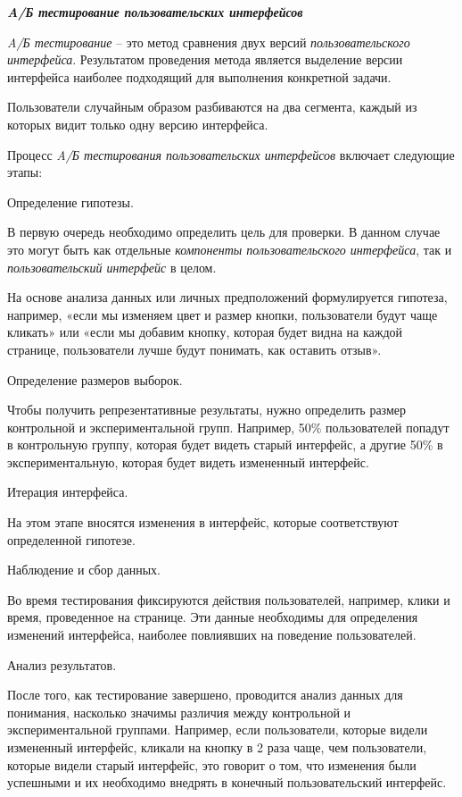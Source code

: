 \textbf{\textit{A/Б тестирование пользовательских интерфейсов}}

\textit{A/Б тестирование} -- это метод сравнения двух версий \textit{пользовательского интерфейса}. Результатом проведения метода является выделение версии интерфейса наиболее подходящий для выполнения конкретной задачи.

Пользователи случайным образом разбиваются на два сегмента, каждый из которых видит только одну версию интерфейса.

Процесс \textit{A/Б тестирования пользовательских интерфейсов} включает следующие этапы:

\begin{textitemize}
	\item Определение гипотезы. 
	
	В первую очередь необходимо определить цель для проверки. В данном случае это могут быть как отдельные \textit{компоненты пользовательского интерфейса}, так и \textit{пользовательский интерфейс} в целом.
	
	На основе анализа данных или личных предположений формулируется гипотеза, например, «если мы изменяем цвет и размер кнопки, пользователи будут чаще кликать» или «если мы добавим кнопку, которая будет видна на каждой странице, пользователи лучше будут понимать, как оставить отзыв».
	
	\item Определение размеров выборок. 
	
	Чтобы получить репрезентативные результаты, нужно определить размер контрольной и экспериментальной групп. Например, 50\% пользователей попадут в контрольную группу, которая будет видеть старый интерфейс, а другие 50\% в экспериментальную, которая будет видеть измененный интерфейс.
	
	\item Итерация интерфейса. 
	
	На этом этапе вносятся изменения в интерфейс, которые соответствуют определенной гипотезе. 
	
	\item Наблюдение и сбор данных. 
	
	Во время тестирования фиксируются действия пользователей, например, клики и время, проведенное на странице. Эти данные необходимы для определения изменений интерфейса, наиболее повлиявших на поведение пользователей.
	
	\item Анализ результатов. 
	
	После того, как тестирование завершено, проводится анализ данных для понимания, насколько значимы различия между контрольной и экспериментальной группами. Например, если пользователи, которые видели измененный интерфейс, кликали на кнопку в 2 раза чаще, чем пользователи, которые видели старый интерфейс, это говорит о том, что изменения были успешными и их необходимо внедрять в конечный пользовательский интерфейс.
\end{textitemize}

